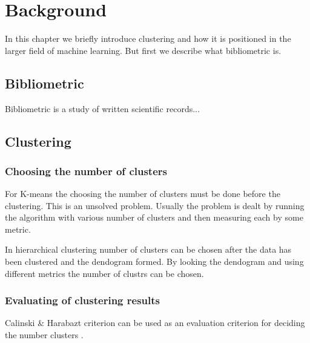 \chapter{Background}
\label{chapter:background}

In this chapter we briefly introduce clustering and how it is 
positioned in the larger field of machine learning. But first we
describe what bibliometric is.

\section{Bibliometric}
\label{sec:bibliometric}

Bibliometric is a study of written scientific records... 




\section{Clustering}



\subsection{Choosing the number of clusters}
For K-means the choosing the number of clusters must be done before
the clustering. This is an unsolved problem. 
Usually the 
problem is dealt by running the algorithm with various number of 
clusters and then measuring each by some metric. 

In hierarchical clustering number of clusters can be chosen after 
the data has been clustered and the dendogram formed. 
 By 
looking the dendogram and using different metrics the number of 
clustrs can be chosen.


\subsection{Evaluating of clustering results}
Calinski \& Harabazt criterion can be used as an evaluation 
criterion for deciding the number clusters . 
